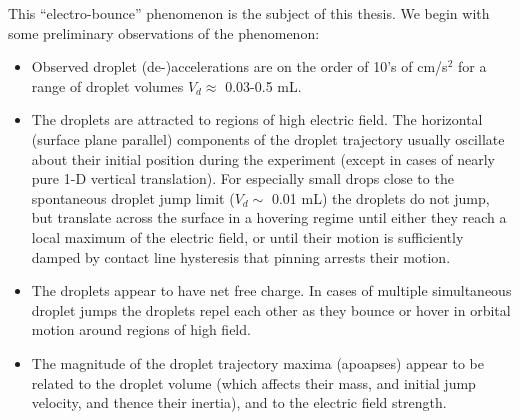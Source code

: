 \documentclass[12pt,a4paper,oneside]{book}
\begin{document}
This ``electro-bounce'' phenomenon is the subject of this thesis. We begin with some preliminary observations of the phenomenon:
\begin{itemize}
\item Observed droplet (de-)accelerations are on the order of 10's of cm/s$^2$ for a range of droplet volumes $V_d \approx$ 0.03-0.5 mL.
\item The droplets are attracted to regions of high electric field. The horizontal (surface plane parallel) components of the droplet trajectory usually oscillate about their initial position during the experiment (except in cases of nearly pure 1-D vertical translation). For especially small drops close to the spontaneous droplet jump limit ($V_d \sim$ 0.01 mL) the droplets do not jump, but translate across the surface in a hovering regime until either they reach a local maximum of the electric field, or until their motion is sufficiently damped by contact line hysteresis that pinning arrests their motion.
\item The droplets appear to have net free charge. In cases of multiple simultaneous droplet jumps the droplets repel each other as they bounce or hover in orbital motion around regions of high field.
\item The magnitude of the droplet trajectory maxima (apoapses) appear to be related to the droplet volume (which affects their mass, and initial jump velocity, and thence their inertia), and to the electric field strength.
\end{itemize}
\end{document}
